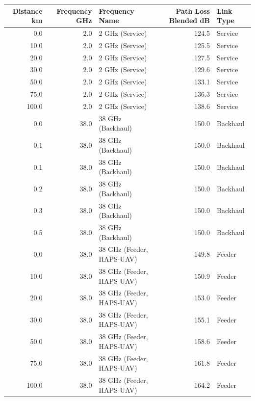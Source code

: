 \begin{tabular}{rrlrl}
\toprule
Distance km & Frequency GHz & Frequency Name & Path Loss Blended dB & Link Type \\
\midrule
0.0 & 2.0 & 2 GHz (Service) & 124.5 & Service \\
10.0 & 2.0 & 2 GHz (Service) & 125.5 & Service \\
20.0 & 2.0 & 2 GHz (Service) & 127.5 & Service \\
30.0 & 2.0 & 2 GHz (Service) & 129.6 & Service \\
50.0 & 2.0 & 2 GHz (Service) & 133.1 & Service \\
75.0 & 2.0 & 2 GHz (Service) & 136.3 & Service \\
100.0 & 2.0 & 2 GHz (Service) & 138.6 & Service \\
0.0 & 38.0 & 38 GHz (Backhaul) & 150.0 & Backhaul \\
0.1 & 38.0 & 38 GHz (Backhaul) & 150.0 & Backhaul \\
0.1 & 38.0 & 38 GHz (Backhaul) & 150.0 & Backhaul \\
0.2 & 38.0 & 38 GHz (Backhaul) & 150.0 & Backhaul \\
0.3 & 38.0 & 38 GHz (Backhaul) & 150.0 & Backhaul \\
0.5 & 38.0 & 38 GHz (Backhaul) & 150.0 & Backhaul \\
0.0 & 38.0 & 38 GHz (Feeder, HAPS-UAV) & 149.8 & Feeder \\
10.0 & 38.0 & 38 GHz (Feeder, HAPS-UAV) & 150.9 & Feeder \\
20.0 & 38.0 & 38 GHz (Feeder, HAPS-UAV) & 153.0 & Feeder \\
30.0 & 38.0 & 38 GHz (Feeder, HAPS-UAV) & 155.1 & Feeder \\
50.0 & 38.0 & 38 GHz (Feeder, HAPS-UAV) & 158.6 & Feeder \\
75.0 & 38.0 & 38 GHz (Feeder, HAPS-UAV) & 161.8 & Feeder \\
100.0 & 38.0 & 38 GHz (Feeder, HAPS-UAV) & 164.2 & Feeder \\
\bottomrule
\end{tabular}
